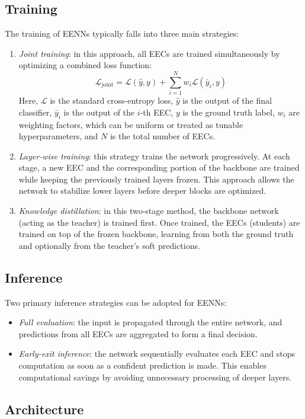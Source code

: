 \subsection{Training}
The training of EENNs typically falls into three main strategies:
\begin{enumerate}
    \item \textit{Joint training}: in this approach, all EECs are trained simultaneously by optimizing a combined loss function:
        \[\mathcal{L}_{\text{joint}}=\mathcal{L}(\hat{y},y)+\sum_{i=1}^{N}w_i\mathcal{L}(\bar{y}_i,y)\]
        Here, $\mathcal{L}$ is the standard cross-entropy loss, $\hat{y}$ is the output of the final classifier, $\bar{y}_i$ is the output of the $i$-th EEC, $y$ is the ground truth label, $w_i$ are weighting factors, which can be uniform or treated as tunable hyperparameters, and $N$ is the total number of EECs.
    \item \textit{Layer-wise training}: this strategy trains the network progressively. 
        At each stage, a new EEC and the corresponding portion of the backbone are trained while keeping the previously trained layers frozen. 
        This approach allows the network to stabilize lower layers before deeper blocks are optimized.
    \item \textit{Knowledge distillation}: in this two-stage method, the backbone network (acting as the teacher) is trained first.
        Once trained, the EECs (students) are trained on top of the frozen backbone, learning from both the ground truth and optionally from the teacher's soft predictions.
\end{enumerate}

\subsection{Inference}
Two primary inference strategies can be adopted for EENNs:
\begin{itemize}
    \item \textit{Full evaluation}: the input is propagated through the entire network, and predictions from all EECs are aggregated to form a final decision.
    \item \textit{Early-exit inference}: the network sequentially evaluates each EEC and stops computation as soon as a confident prediction is made. 
        This enables computational savings by avoiding unnecessary processing of deeper layers.
\end{itemize}

\subsection{Architecture}
